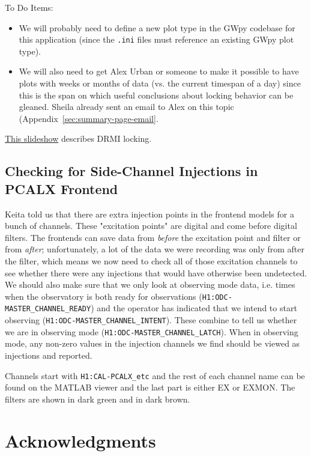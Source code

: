 \documentclass{article}
\newcommand*{\TODO}{\textcolor{todo}}
\begin{document}
To Do Items:

\begin{itemize}
    \item \TODO{We will probably need to define a new plot type in the GWpy codebase for this application (since the \texttt{.ini} files must reference an existing GWpy plot type).}
    \item \TODO{We will also need to get Alex Urban or someone to make it possible to have plots with weeks or months of data (vs. the current timespan of a day) since this is the span on which useful conclusions about locking behavior can be gleaned. Sheila already sent an email to Alex on this topic (Appendix~\ref{sec:summary-page-email}.}
\end{itemize}
\href{https://dcc.ligo.org/LIGO-G1301236}{This slideshow} describes DRMI locking.

\TODO{\subsection{Checking for Side-Channel Injections in PCALX Frontend}
}

Keita told us that there are extra injection points in the frontend models for a bunch of channels. These "excitation points" are digital and come before digital filters. The frontends can save data from \textit{before} the excitation point and filter or from \textit{after}; unfortunately, a lot of the data we were recording was only from after the filter, which means we now need to check all of those excitation channels to see whether there were any injections that would have otherwise been undetected. We should also make sure that we only look at observing mode data, i.e. times when the observatory is both ready for observations (\texttt{H1:ODC-MASTER\_CHANNEL\_READY}) and the operator has indicated that we intend to start observing (\texttt{H1:ODC-MASTER\_CHANNEL\_INTENT}). These combine to tell us whether we are in observing mode (\texttt{H1:ODC-MASTER\_CHANNEL\_LATCH}). When in observing mode, any non-zero values in the injection channels we find should be viewed as injections and reported.

Channels start with \texttt{H1:CAL-PCALX\_etc} and the rest of each channel name can be found on the MATLAB viewer and the last part is either EX or EXMON. The filters are shown in dark green and in dark brown.

\section{Acknowledgments}
\end{document}
